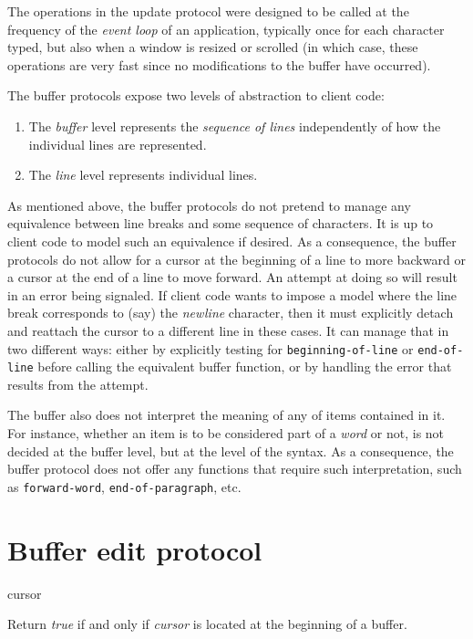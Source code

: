 The operations in the update protocol were designed to be called at
the frequency of the \emph{event loop} of an application, typically
once for each character typed, but also when a window is resized or
scrolled (in which case, these operations are very fast since no
modifications to the buffer have occurred). 

The buffer protocols expose two levels of abstraction to client code: 

\begin{enumerate}
\item The \emph{buffer} level represents the \emph{sequence of lines}
  independently of how the individual lines are represented.  
\item The \emph{line} level represents individual lines. 
\end{enumerate}

As mentioned above, the buffer protocols do not pretend to manage any
equivalence between line breaks and some sequence of characters.  It
is up to client code to model such an equivalence if desired.  As a
consequence, the buffer protocols do not allow for a cursor at the
beginning of a line to more backward or a cursor at the end of a line
to move forward.  An attempt at doing so will result in an error being
signaled.  If client code wants to impose a model where the line break
corresponds to (say) the \emph{newline} character, then it must
explicitly detach and reattach the cursor to a different line in these
cases.  It can manage that in two different ways: either by explicitly
testing for \texttt{beginning-of-line} or \texttt{end-of-line} before
calling the equivalent buffer function, or by handling the error that
results from the attempt.

The buffer also does not interpret the meaning of any of items
contained in it.  For instance, whether an item is to be considered
part of a \emph{word} or not, is not decided at the buffer level, but
at the level of the syntax.  As a consequence, the buffer protocol
does not offer any functions that require such interpretation, such as
\texttt{forward-word}, \texttt{end-of-paragraph}, etc. 

\section{Buffer edit protocol}

 {cursor}

Return \textit{true} if and only if \textit{cursor} is located at the
beginning of a buffer.

